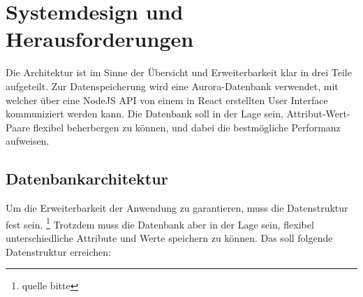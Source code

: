\section{Systemdesign und Herausforderungen}
Die Architektur ist im Sinne der Übersicht und Erweiterbarkeit klar in drei Teile aufgeteilt. 
Zur Datenspeicherung wird eine Aurora-Datenbank verwendet, mit welcher über eine NodeJS API von einem in 
React erstellten User Interface kommuniziert werden kann. Die Datenbank soll in der Lage sein, 
Attribut-Wert-Paare flexibel beherbergen zu können, und dabei die bestmögliche Performanz aufweisen.
\subsection{Datenbankarchitektur}
Um die Erweiterbarkeit der Anwendung zu garantieren, muss die Datenstruktur fest sein. \footnote{quelle bitte} Trotzdem muss die Datenbank aber 
in der Lage sein, flexibel unterschiedliche Attribute und Werte speichern zu können. Das soll folgende Datenstruktur erreichen:\break

